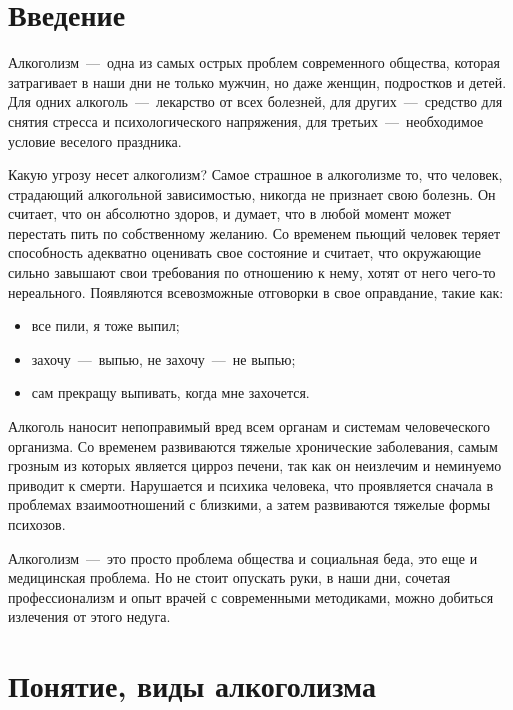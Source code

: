 \documentclass[14pt]{extarticle}
\begin{document}
\title{}
\maketitle


\section{Введение}

Алкоголизм~---~одна из самых острых проблем современного общества, которая затрагивает в наши дни не только мужчин, но даже женщин, подростков и детей. Для одних алкоголь~---~лекарство от всех болезней, для других~---~средство для снятия стресса и психологического напряжения, для третьих~---~необходимое условие веселого праздника.

Какую угрозу несет алкоголизм? Самое страшное в алкоголизме то, что человек, страдающий алкогольной зависимостью, никогда не признает свою болезнь. Он считает, что он абсолютно здоров, и думает, что в любой момент может перестать пить по собственному желанию.
Со временем пьющий человек теряет способность адекватно оценивать свое состояние и считает, что окружающие сильно завышают свои требования по отношению к нему, хотят от него чего-то нереального. Появляются всевозможные отговорки в свое оправдание, такие как:

\begin{itemize}
	\item все пили, я тоже выпил;
	\item захочу~---~выпью, не захочу~---~не выпью;
	\item сам прекращу выпивать, когда мне захочется.
\end{itemize}	

Алкоголь наносит непоправимый вред всем органам и системам человеческого организма. Со временем развиваются тяжелые хронические заболевания, самым грозным из которых является цирроз печени, так как он неизлечим и неминуемо приводит к смерти. Нарушается и психика человека, что проявляется сначала в проблемах взаимоотношений с близкими, а затем развиваются тяжелые формы психозов.

Алкоголизм~---~это просто проблема общества и социальная беда, это еще и медицинская проблема. Но не стоит опускать руки, в наши дни, сочетая профессионализм и опыт врачей с современными методиками, можно добиться излечения от этого недуга.
\section{Понятие, виды алкоголизма}
\end{document}
